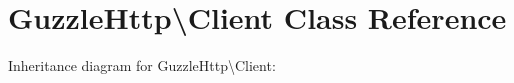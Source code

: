 \hypertarget{classGuzzleHttp_1_1Client}{}\section{Guzzle\+Http\textbackslash{}Client Class Reference}
\label{classGuzzleHttp_1_1Client}


Inheritance diagram for Guzzle\+Http\textbackslash{}Client\+:
